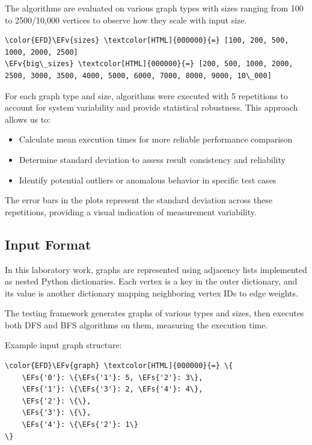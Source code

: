 \documentclass[a4paper,12pt]{article}
\newcommand{\EFs}[1]{\textcolor{EFs}{#1}} %
\newcommand{\EFv}[1]{\textcolor{EFv}{#1}} %
\begin{document}
The algorithms are evaluated on various graph types with sizes ranging from 100 to 2500/10,000 vertices to observe how they scale with input size.

\begin{Code}
\begin{Verbatim}
\color{EFD}\EFv{sizes} \textcolor[HTML]{000000}{=} [100, 200, 500, 1000, 2000, 2500]
\EFv{big\_sizes} \textcolor[HTML]{000000}{=} [200, 500, 1000, 2000, 2500, 3000, 3500, 4000, 5000, 6000, 7000, 8000, 9000, 10\_000]
\end{Verbatim}
\end{Code}

For each graph type and size, algorithms were executed with 5 repetitions to account for system variability and provide statistical robustness. This approach allows us to:

\begin{itemize}
\item Calculate mean execution times for more reliable performance comparison
\item Determine standard deviation to assess result consistency and reliability
\item Identify potential outliers or anomalous behavior in specific test cases
\end{itemize}

The error bars in the plots represent the standard deviation across these repetitions, providing a visual indication of measurement variability.
\subsection{Input Format}
\label{sec:orge7d2f47}
In this laboratory work, graphs are represented using adjacency lists implemented as nested Python dictionaries. Each vertex is a key in the outer dictionary, and its value is another dictionary mapping neighboring vertex IDs to edge weights.

The testing framework generates graphs of various types and sizes, then executes both DFS and BFS algorithms on them, measuring the execution time.

Example input graph structure:
\begin{Code}
\begin{Verbatim}
\color{EFD}\EFv{graph} \textcolor[HTML]{000000}{=} \{
    \EFs{'0'}: \{\EFs{'1'}: 5, \EFs{'2'}: 3\},
    \EFs{'1'}: \{\EFs{'3'}: 2, \EFs{'4'}: 4\},
    \EFs{'2'}: \{\},
    \EFs{'3'}: \{\},
    \EFs{'4'}: \{\EFs{'2'}: 1\}
\}
\end{Verbatim}
\end{Code}
\end{document}
